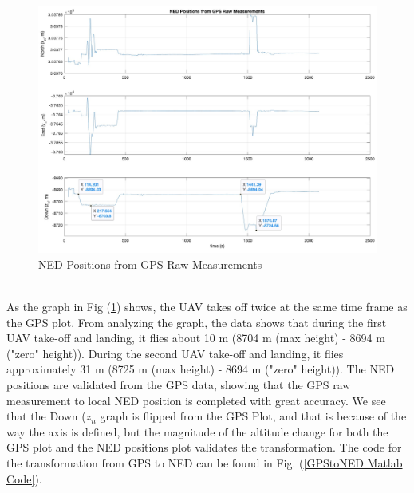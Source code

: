\begin{figure}[H]
  \centering
 \includegraphics[width=0.8\linewidth, height=0.7\linewidth]{GPS/GPS2NED.png}  
\caption{NED Positions from GPS Raw Measurements}
\label{fig:GPS2NED}
\end{figure}
\\
As the graph in Fig (\ref{fig:GPS2NED}) shows, the UAV takes off twice at the same time frame as the GPS plot. From analyzing the graph, the data shows that during the first UAV take-off and landing, it flies about 10 m (8704 m (max height) - 8694 m ("zero" height)). During the second UAV take-off and landing, it flies approximately 31 m (8725 m (max height) - 8694 m ("zero" height)). The NED positions are validated from the GPS data, showing that the GPS raw measurement to local NED position is completed with great accuracy. We see that the Down ($z_n$ graph is flipped from the GPS Plot, and that is because of the way the axis is defined, but the magnitude of the altitude change for both the GPS plot and the NED positions plot validates the transformation. The code for the transformation from GPS to NED can be found in Fig. (\ref{GPStoNED Matlab Code}). 

\label{GPStoNED Matlab Code}
